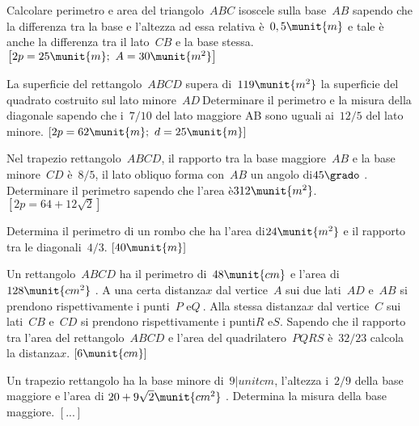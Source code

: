 \begin{htmulticols}{2}
\begin{esercizio}
 \label{ese:3.138}
Calcolare perimetro e area del triangolo~\(ABC\) isoscele sulla 
base~\(AB\) sapendo che la differenza tra la base e l'altezza ad essa 
relativa è~\(0,5\munit{m}\) e tale è anche la differenza tra il 
lato~\(CB\) e la base stessa.
\hfill\(\left[2p=25\munit{m};~A=30\munit{m^2}\right]\)
\end{esercizio}

\begin{esercizio}
 \label{ese:3.139}
La superficie del rettangolo~\(ABCD\) supera di~\(119\munit{m^2}\) la 
superficie del quadrato costruito sul lato minore~\(AD~\)Determinare il 
perimetro e la misura della diagonale sapendo che i~\(7/10\) del lato 
maggiore AB sono uguali ai~\(12/5\) del lato minore.
\hfill\(\left[2p=62\munit{m};~d=25\munit{m}\right]\)
\end{esercizio}

\begin{esercizio}
 \label{ese:3.140}
Nel trapezio rettangolo~\(ABCD\), il rapporto tra la base maggiore~\(AB\) 
e la base minore~\(CD\) è~\(8/5\), il lato obliquo forma con~\(AB\) un 
angolo di\(45\grado~\). 
Determinare il perimetro sapendo che l'area è\(312\munit{m^2}\).
\hfill\(\left[2p = 64 + 12 \sqrt{2}\right]\)
\end{esercizio}

\begin{esercizio}
 \label{ese:3.141}
Determina il perimetro di un rombo che ha l'area di\(24\munit{m^2}\) e il 
rapporto tra le diagonali~\(4/3\).
\hfill\(\left[40\munit{m}\right]\)
\end{esercizio}

\begin{esercizio}
 \label{ese:3.142}
Un rettangolo~\(ABCD\) ha il perimetro di~\(48\munit{cm}\) e l'area di 
\(128\munit{cm^2}~\). 
A una certa distanza\(x\) dal vertice~\(A\) sui due lati~\(AD\) e~\(AB\) 
si prendono rispettivamente i punti~\(P\) e\( Q~\).
Alla stessa distanza\( x\) dal vertice~\(C\) sui lati~\(CB\) e~\(CD\) si
prendono rispettivamente i punti\( R\) e\( S\). 
Sapendo che il rapporto tra l'area del rettangolo~\(ABCD\) e l'area del 
quadrilatero~\(PQRS\) è~\(32/23\) calcola la distanza\(x\).
\hfill\(\left[6\munit{cm}\right]\)
\end{esercizio}

\begin{esercizio}
 \label{ese:3.143}
Un trapezio rettangolo ha la base minore di~\(9|unit{cm}\), l'altezza 
i~\(2/9\) della base maggiore e l'area di 
\(20 + 9 \sqrt{2}\munit{cm^{2}}~\). 
Determina la misura della base maggiore.
\hfill\(\left[...\right]\)
\end{esercizio}


\end{htmulticols}
